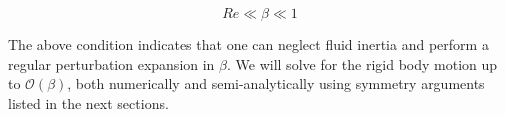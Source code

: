 \documentclass{jfm}
\begin{document}
\begin{equation}
    Re \ll \beta \ll 1
\end{equation}

The above condition indicates that one can neglect fluid inertia and perform a regular perturbation expansion in $\beta$.  We will solve for the rigid body motion up to $\mathcal{O}(\beta)$, both numerically and semi-analytically using symmetry arguments listed in the next sections.


\end{document}
